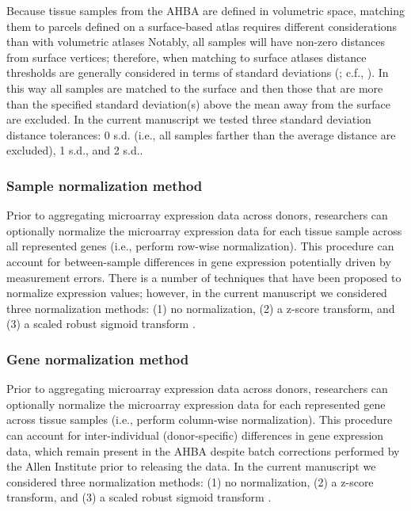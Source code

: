 \documentclass[12pt,aps,pra,reprint,showkeys]{revtex4-1}
\begin{document}
Because tissue samples from the AHBA are defined in volumetric space, matching them to parcels defined on a surface-based atlas requires different considerations than with volumetric atlases
Notably, all samples will have non-zero distances from surface vertices; therefore, when matching to surface atlases distance thresholds are generally considered in terms of standard deviations (\citealt{burt2018natneuro}; c.f., \citealt{anderson2020pnas}).
In this way all samples are matched to the surface and then those that are more than the specified standard deviation(s) above the mean away from the surface are excluded.
In the current manuscript we tested three standard deviation distance tolerances: 0 s.d. (i.e., all samples farther than the average distance are excluded), 1 s.d., and 2 s.d..

\subsubsection*{Sample normalization method}

Prior to aggregating microarray expression data across donors, researchers can optionally normalize the microarray expression data for each tissue sample across all represented genes (i.e., perform row-wise normalization).
This procedure can account for between-sample differences in gene expression potentially driven by measurement errors.
There is a number of techniques that have been proposed to normalize expression values; however, in the current manuscript we considered three normalization methods: (1) no normalization, (2) a z-score transform, and (3) a scaled robust sigmoid transform \citep{fulcher2013jrsi}.

\subsubsection*{Gene normalization method}

Prior to aggregating microarray expression data across donors, researchers can optionally normalize the microarray expression data for each represented gene across tissue samples (i.e., perform column-wise normalization).
This procedure can account for inter-individual (donor-specific) differences in gene expression data, which remain present in the AHBA despite batch corrections performed by the Allen Institute prior to releasing the data.
In the current manuscript we considered three normalization methods: (1) no normalization, (2) a z-score transform, and (3) a scaled robust sigmoid transform \citep{fulcher2013jrsi}.
\end{document}
